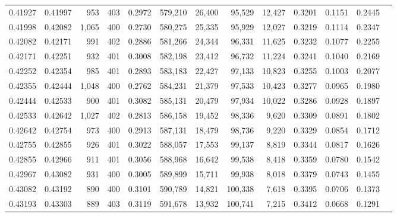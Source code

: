 \begin{tabular}{rrrrrrrrrrrrr}
0.41927 & 0.41997 &    953 & 403 &                                     0.2972 & 579,210 &  26,400 &  95,529 &  12,427 & 0.3201 & 0.1151 & 0.2445 \\
0.41998 & 0.42082 &  1,065 & 400 &                                     0.2730 & 580,275 &  25,335 &  95,929 &  12,027 & 0.3219 & 0.1114 & 0.2347 \\
0.42082 & 0.42171 &    991 & 402 &                                     0.2886 & 581,266 &  24,344 &  96,331 &  11,625 & 0.3232 & 0.1077 & 0.2255 \\
0.42171 & 0.42251 &    932 & 401 &                                     0.3008 & 582,198 &  23,412 &  96,732 &  11,224 & 0.3241 & 0.1040 & 0.2169 \\
0.42252 & 0.42354 &    985 & 401 &                                     0.2893 & 583,183 &  22,427 &  97,133 &  10,823 & 0.3255 & 0.1003 & 0.2077 \\
0.42355 & 0.42444 &  1,048 & 400 &                                     0.2762 & 584,231 &  21,379 &  97,533 &  10,423 & 0.3277 & 0.0965 & 0.1980 \\
0.42444 & 0.42533 &    900 & 401 &                                     0.3082 & 585,131 &  20,479 &  97,934 &  10,022 & 0.3286 & 0.0928 & 0.1897 \\
0.42533 & 0.42642 &  1,027 & 402 &                                     0.2813 & 586,158 &  19,452 &  98,336 &   9,620 & 0.3309 & 0.0891 & 0.1802 \\
0.42642 & 0.42754 &    973 & 400 &                                     0.2913 & 587,131 &  18,479 &  98,736 &   9,220 & 0.3329 & 0.0854 & 0.1712 \\
0.42755 & 0.42855 &    926 & 401 &                                     0.3022 & 588,057 &  17,553 &  99,137 &   8,819 & 0.3344 & 0.0817 & 0.1626 \\
0.42855 & 0.42966 &    911 & 401 &                                     0.3056 & 588,968 &  16,642 &  99,538 &   8,418 & 0.3359 & 0.0780 & 0.1542 \\
0.42967 & 0.43082 &    931 & 400 &                                     0.3005 & 589,899 &  15,711 &  99,938 &   8,018 & 0.3379 & 0.0743 & 0.1455 \\
0.43082 & 0.43192 &    890 & 400 &                                     0.3101 & 590,789 &  14,821 & 100,338 &   7,618 & 0.3395 & 0.0706 & 0.1373 \\
0.43193 & 0.43303 &    889 & 403 &                                     0.3119 & 591,678 &  13,932 & 100,741 &   7,215 & 0.3412 & 0.0668 & 0.1291 \\

\end{tabular}
